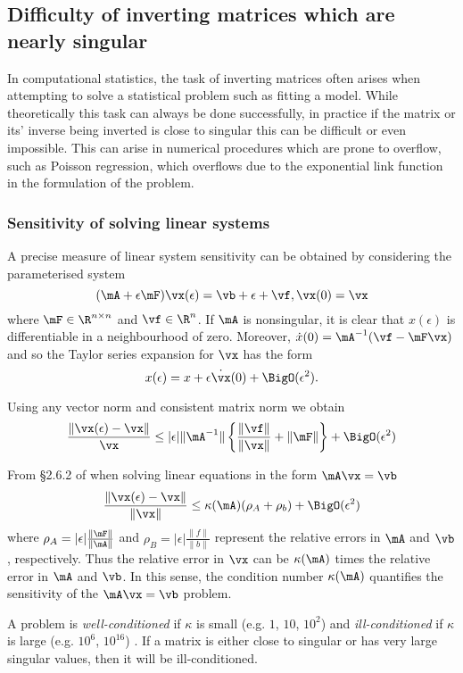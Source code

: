 \subsection{Difficulty of inverting matrices which are nearly singular}
In computational statistics, the task of inverting matrices often arises when
attempting to solve a statistical problem such as fitting a model. While theoretically this task can always be
done successfully, in practice if the matrix or its' inverse being inverted is close to singular this can be
difficult or even impossible. This can arise in numerical procedures which are prone to overflow, such as
Poisson regression, which overflows due to the exponential link function in the formulation of the problem.

\subsubsection{Sensitivity of solving linear systems}

A precise measure of linear system sensitivity can be obtained by considering the parameterised system
\[
	(\mA + \epsilon \mF) \vx(\epsilon) = \vb + \epsilon + \vf,  \vx(0) = \vx
\]
where $\mF \in \R^{n \times n}$ and $\vf \in \R^n$. If $\mA$ is nonsingular, it is clear that $x(\epsilon)$ is
differentiable in a neighbourhood of zero. Moreover, $\dot{x}(0) = \mA^{-1} (\vf - \mF \vx)$ and so the
Taylor series expansion for $\vx$ has the form
\[
	x(\epsilon) = x + \epsilon \dot{\vx}(0) + \BigO(\epsilon^2).
\]

Using any vector norm and consistent matrix norm we obtain
\[
	\frac{\|\vx(\epsilon) - \vx\|}{\vx} \leq |\epsilon| \|\mA^{-1}\| \left\{\frac{\|\vf\|}{\|\vx\|} + \|\mF\|\right\} + \BigO(\epsilon^2)
\]

From \S 2.6.2 of \citep{Golub:1996:MC:248979}
when solving linear equations in the form $\mA \vx = \vb$
\[
	\frac{\|\vx(\epsilon) - \vx\|}{\|\vx\|} \leq \kappa(\mA) (\rho_A + \rho_b) + \BigO(\epsilon^2)
\]
where $\rho_A = |\epsilon| \frac{\|\mF\|}{\|\mA\|}$ and $\rho_B = |\epsilon| \frac{\|f\|}{\|b\|}$ represent
the relative errors in $\mA$ and $\vb$, respectively. Thus the relative error in $\vx$ can be $\kappa(\mA)$
times the relative error in $\mA$ and $\vb$. In this sense, the condition number $\kappa(\mA)$ quantifies the
sensitivity of the $\mA \vx = \vb$ problem.


A problem is \emph{well-conditioned} if $\kappa$ is small (e.g. $1$, $10$, $10^2$) and \emph{ill-conditioned}
if $\kappa$ is large (e.g. $10^6$, $10^{16}$) \cite{trefethen97}.  If a matrix is either close to singular or
has very large singular values, then it will be ill-conditioned.

